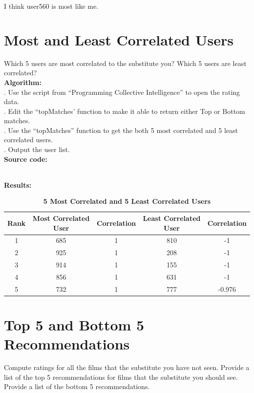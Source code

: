 \documentclass{article}
\begin{document}
		I think user560 is most like me.\\
		\section{Most and Least Correlated Users}
		\indent Which 5 users are most correlated to the substitute you? Which 5 users are least correlated?\\

		\noindent\textbf{Algorithm:}\\
		. Use the script from ``Programming Collective Intelligence'' to open the rating data.\\
		. Edit the ``topMatches' function to make it able to return either Top or Bottom matches.\\
		. Use the ``topMatches'' function to get the both 5 most correlated and 5 least correlated users.\\
		. Output the user list.\\

		\noindent\textbf{Source code:}
		

		\noindent\\\textbf{Results:}
		\begin{table}[!htb]
			\centering
			\caption{\textbf{5 Most Correlated and 5 Least Correlated Users}}
			\begin{tabular}{ccccc}
				\toprule
				\textbf{Rank} & \textbf{Most Correlated User} & \textbf{Correlation} & \textbf{Least Correlated User} & \textbf{Correlation}\\
				\midrule
				1 & 685 & 1 & 810 & -1\\
				2 & 925 & 1 & 208 & -1\\
				3 & 914 & 1 & 155 & -1\\
				4 & 856 & 1 & 631 & -1\\
				5 & 732 & 1 & 777 & -0.976\\
				\bottomrule
			\end{tabular}
		\end{table}
		\section{Top 5 and Bottom 5 Recommendations}
		\indent Compute ratings for all the films that the substitute you have not seen. Provide a list of the top 5 recommendations for films that the substitute you should see. Provide a list of the bottom 5 recommendations.\\
\end{document}
